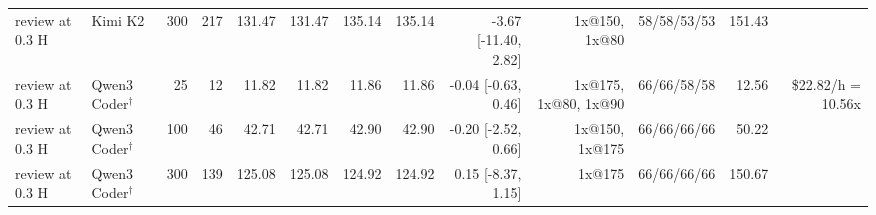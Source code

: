 \begin{table}[t]
\begin{tabular}{llrrrrrrrrrrr}
review at 0.3 H & Kimi K2 & 300 & 217 & 131.47 & 131.47 & 135.14 & 135.14 & -3.67 [-11.40, 2.82] & 1x@150, 1x@80 & 58/58/53/53 & 151.43 &  \\
review at 0.3 H & Qwen3 Coder$^\dagger$ & 25 & 12 & 11.82 & 11.82 & 11.86 & 11.86 & -0.04 [-0.63, 0.46] & 1x@175, 1x@80, 1x@90 & 66/66/58/58 & 12.56 & \$22.82/h = 10.56x \\
review at 0.3 H & Qwen3 Coder$^\dagger$ & 100 & 46 & 42.71 & 42.71 & 42.90 & 42.90 & -0.20 [-2.52, 0.66] & 1x@150, 1x@175 & 66/66/66/66 & 50.22 &  \\
review at 0.3 H & Qwen3 Coder$^\dagger$ & 300 & 139 & 125.08 & 125.08 & 124.92 & 124.92 & 0.15 [-8.37, 1.15] & 1x@175 & 66/66/66/66 & 150.67 &  \\
\bottomrule
\end{tabular}
\end{table}
